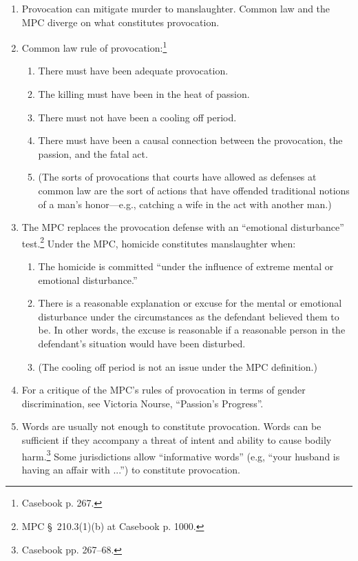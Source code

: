 \begin{enumerate}
    \item Provocation can mitigate murder to manslaughter. Common law and the MPC diverge on what constitutes provocation.
    \item Common law rule of provocation:\footnote{Casebook p. 267.}
    \begin{enumerate}
        \item There must have been adequate provocation.
        \item The killing must have been in the heat of passion.
        \item There must not have been a cooling off period.
        \item There must have been a causal connection between the provocation, the passion, and the fatal act.
        \item (The sorts of provocations that courts have allowed as defenses at common law are the sort of actions that have offended traditional notions of a man's honor---e.g., catching a wife in the act with another man.)
    \end{enumerate}
    \item The MPC replaces the provocation defense with an ``emotional disturbance'' test.\footnote{MPC § 210.3(1)(b) at Casebook p. 1000.} Under the MPC, homicide constitutes manslaughter when:
    \begin{enumerate}
        \item The homicide is committed ``under the influence of extreme mental or emotional disturbance.''
        \item There is a reasonable explanation or excuse for the mental or emotional disturbance under the circumstances as the defendant believed them to be. In other words, the excuse is reasonable if a reasonable person in the defendant's situation would have been disturbed.
        \item (The cooling off period is not an issue under the MPC definition.)
    \end{enumerate}
    \item For a critique of the MPC's rules of provocation in terms of gender discrimination, see Victoria Nourse, ``Passion's Progress''.
    \item Words are usually not enough to constitute provocation. Words can be sufficient if they accompany a threat of intent and ability to cause bodily harm.\footnote{Casebook pp. 267--68.} Some jurisdictions allow ``informative words'' (e.g, ``your husband is having an affair with ...'') to constitute provocation.
\end{enumerate}

